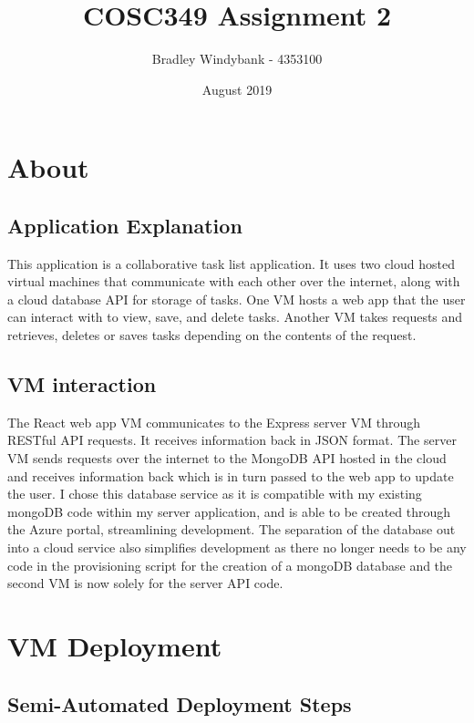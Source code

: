 \documentclass[12pt]{extarticle}
\title{COSC349 Assignment 2}
\author{Bradley Windybank - 4353100}
\date{August 2019}
\begin{document}
\maketitle

\section{About}
\subsection{Application Explanation}
This application is a collaborative task list application. It uses two cloud hosted virtual machines that communicate with each other over the internet, along with a cloud database API for storage of tasks. One VM hosts a web app that the user can interact with to view, save, and delete tasks. Another VM takes requests and retrieves, deletes or saves tasks depending on the contents of the request.

\subsection{VM interaction}
The React web app VM communicates to the Express server VM through RESTful API requests. It receives information back in JSON format. The server VM sends requests over the internet to the MongoDB API hosted in the cloud and receives information back which is in turn passed to the web app to update the user. I chose this database service as it is compatible with my existing mongoDB code within my server application, and is able to be created through the Azure portal, streamlining development. The separation of the database out into a cloud service also simplifies development as there no longer needs to be any code in the provisioning script for the creation of a mongoDB database and the second VM is now solely for the server API code.

\section{VM Deployment}

\subsection{Semi-Automated Deployment Steps}
\end{document}
